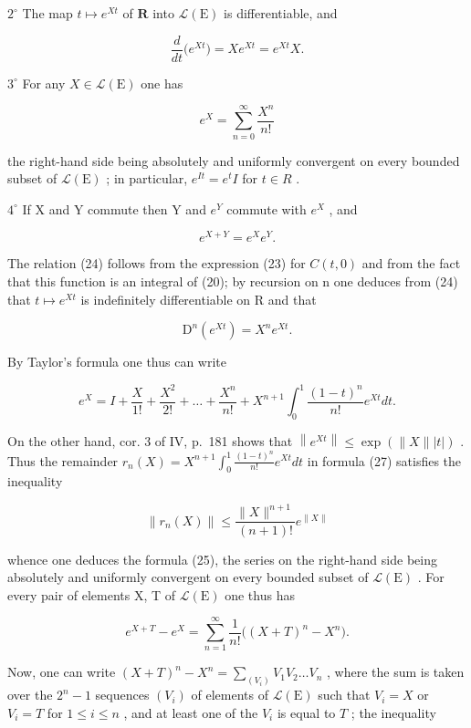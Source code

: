 \(2^{\circ}\) The map \(t\mapsto e^{Xt}\) of \(\mathbf{R}\) into \(\mathcal{L}(\mathrm{E})\) is differentiable, and

\[
\frac {d}{d t} \big (e ^ {X t} \big) = X e ^ {X t} = e ^ {X t} X.\tag{24}
\]

\(3^{\circ}\) For any \(X\in \mathcal{L}(\mathrm{E})\) one has

\[
e ^ {X} = \sum_ {n = 0} ^ {\infty} \frac {X ^ {n}}{n !}\tag{25}
\]

the right-hand side being absolutely and uniformly convergent on every bounded subset of \(\mathcal{L}(\mathrm{E})\) ; in particular, \(e^{It} = e^{t}I\) for \(t \in R\) .

\(4^{\circ}\) If X and Y commute then Y and \(e^{Y}\) commute with \(e^{X}\) , and

\[
e ^ {X + Y} = e ^ {X} e ^ {Y}.\tag{26}
\]

The relation (24) follows from the expression (23) for \(C(t,0)\) and from the fact that this function is an integral of (20); by recursion on n one deduces from (24) that \(t \mapsto e^{Xt}\) is indefinitely differentiable on R and that

\[
\mathrm{D} ^ {n} \left(e ^ {X t}\right) = X ^ {n} e ^ {X t}.
\]

By Taylor's formula one thus can write

\[
e ^ {X} = I + \frac {X}{1 !} + \frac {X ^ {2}}{2 !} + \dots + \frac {X ^ {n}}{n !} + X ^ {n + 1} \int_ {0} ^ {1} \frac {(1 - t) ^ {n}}{n !} e ^ {X t} d t.\tag{27}
\]

On the other hand, cor. 3 of IV, p.~181 shows that \(\left\| e^{Xt}\right\| \leqslant \exp \left(\| X\| |t|\right)\) . Thus the remainder \(r_n(X) = X^{n + 1}\int_0^1\frac{(1 - t)^n}{n!} e^{Xt}dt\) in formula (27) satisfies the inequality

\[
\| r _ {n} (X) \| \leqslant \frac {\| X \| ^ {n + 1}}{(n + 1) !} e ^ {\| X \|}
\]

whence one deduces the formula (25), the series on the right-hand side being absolutely and uniformly convergent on every bounded subset of \(\mathcal{L}(\mathrm{E})\) . For every pair of elements X, T of \(\mathcal{L}(\mathrm{E})\) one thus has

\[
e ^ {X + T} - e ^ {X} = \sum_ {n = 1} ^ {\infty} \frac {1}{n !} \big ((X + T) ^ {n} - X ^ {n} \big).
\]

Now, one can write \((X + T)^n - X^n = \sum_{(V_i)} V_1 V_2 \ldots V_n\) , where the sum is taken over the \(2^n - 1\) sequences \((V_i)\) of elements of \(\mathcal{L}(\mathrm{E})\) such that \(V_i = X\) or \(V_i = T\) for \(1 \leqslant i \leqslant n\) , and at least one of the \(V_i\) is equal to \(T\) ; the inequality

